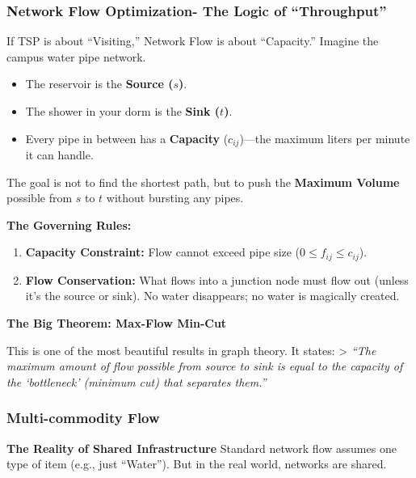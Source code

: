 \documentclass[
  letterpaper,
  DIV=11,
  numbers=noendperiod]{scrreprt}
\providecommand{\tightlist}{%
  \setlength{\itemsep}{0pt}\setlength{\parskip}{0pt}}
\begin{document}
\subsubsection{Network Flow Optimization- The Logic of
``Throughput''}\label{network-flow-optimization--the-logic-of-throughput}

If TSP is about ``Visiting,'' Network Flow is about ``Capacity.''
Imagine the campus water pipe network.

\begin{itemize}
\tightlist
\item
  The reservoir is the \textbf{Source (\(s\))}.
\item
  The shower in your dorm is the \textbf{Sink (\(t\))}.
\item
  Every pipe in between has a \textbf{Capacity} (\(c_{ij}\))---the
  maximum liters per minute it can handle.
\end{itemize}

The goal is not to find the shortest path, but to push the
\textbf{Maximum Volume} possible from \(s\) to \(t\) without bursting
any pipes.

\textbf{The Governing Rules:}

\begin{enumerate}
\def\labelenumi{\arabic{enumi}.}
\tightlist
\item
  \textbf{Capacity Constraint:} Flow cannot exceed pipe size
  (\(0 \le f_{ij} \le c_{ij}\)).
\item
  \textbf{Flow Conservation:} What flows into a junction node must flow
  out (unless it's the source or sink). No water disappears; no water is
  magically created.
\end{enumerate}

\textbf{The Big Theorem: Max-Flow Min-Cut}

This is one of the most beautiful results in graph theory. It states:
\textgreater{} \emph{``The maximum amount of flow possible from source
to sink is equal to the capacity of the `bottleneck' (minimum cut) that
separates them.''}

\subsubsection{Multi-commodity Flow}\label{multi-commodity-flow}

\textbf{The Reality of Shared Infrastructure} Standard network flow
assumes one type of item (e.g., just ``Water''). But in the real world,
networks are shared.
\end{document}
